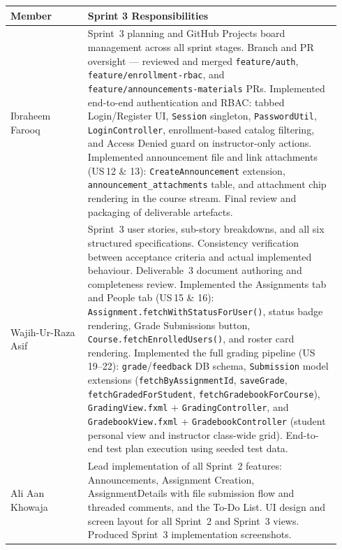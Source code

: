 \documentclass[12pt, a4paper]{article}
\newcommand{\fcolplain}[1]{\textbf{#1}}
\begin{document}
\begin{center}
\begin{tabular}{@{}p{0.22\linewidth}@{\hspace{6pt}}p{0.72\linewidth}@{}}
  \toprule
  \fcolplain{Member} & Sprint 3 Responsibilities \\
  \midrule
  Ibraheem Farooq
    & Sprint~3 planning and GitHub Projects board management across all sprint
      stages. Branch and PR oversight --- reviewed and merged
      \texttt{feature/auth}, \texttt{feature/enrollment-rbac}, and
      \texttt{feature/announcements-materials} PRs. Implemented end-to-end
      authentication and RBAC: tabbed Login/Register UI, \texttt{Session}
      singleton, \texttt{PasswordUtil}, \texttt{LoginController},
      enrollment-based catalog filtering, and Access Denied guard on
      instructor-only actions. Implemented announcement file and link
      attachments (US\,12 \& 13): \texttt{CreateAnnouncement} extension,
      \texttt{announcement\_attachments} table, and attachment chip rendering
      in the course stream. Final review and packaging of deliverable
      artefacts. \\
  \addlinespace[4pt]
Wajih-Ur-Raza Asif
    & Sprint~3 user stories, sub-story breakdowns, and all six structured
      specifications. Consistency verification between acceptance criteria and
      actual implemented behaviour. Deliverable~3 document authoring and
      completeness review. Implemented the Assignments tab and People tab
      (US\,15 \& 16): \texttt{Assignment.fetchWithStatusForUser()}, status
      badge rendering, Grade Submissions button,
      \texttt{Course.fetchEnrolledUsers()}, and roster card rendering.
      Implemented the full grading pipeline (US\,19--22):
      \texttt{grade}/\texttt{feedback} DB schema, \texttt{Submission} model
      extensions (\texttt{fetchByAssignmentId}, \texttt{saveGrade},
      \texttt{fetchGradedForStudent}, \texttt{fetchGradebookForCourse}),
      \texttt{GradingView.fxml} + \texttt{GradingController}, and
      \texttt{GradebookView.fxml} + \texttt{GradebookController} (student
      personal view and instructor class-wide grid). End-to-end test plan
      execution using seeded test data. \\
  \addlinespace[4pt]
  Ali Aan Khowaja
    & Lead implementation of all Sprint~2 features: Announcements, Assignment
      Creation, AssignmentDetails with file submission flow and threaded
      comments, and the To-Do List. UI design and screen layout for all
      Sprint~2 and Sprint~3 views. Produced Sprint~3 implementation
      screenshots. \\
  \bottomrule
\end{tabular}
\end{center}
\end{document}
